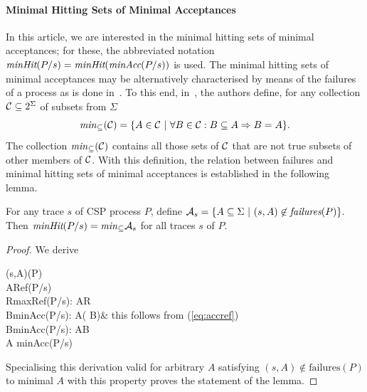 \paragraph{Minimal Hitting Sets of Minimal Acceptances} In this article, we are
interested in the minimal hitting sets of minimal acceptances; for these, the
abbreviated notation
$%
\minhits(P/s) = \minhits(\minaccs(P/s))
$ %
is used. The minimal hitting sets
of minimal acceptances may be alternatively characterised by means of the
failures of a process as is done in~\cite{DBLP:conf/icfem/CavalcantiG07}. To
this end, in~\cite{DBLP:conf/icfem/CavalcantiG07}, the authors define, for
any collection ${\cal C}\subseteq 2^\Sigma$ of subsets from $\Sigma$
\begin{equation}\label{eq:minsub}
{\it min}_\subseteq({\cal C}) = \{ A\in {\cal C}~|~\forall B\in {\cal C}:
B\subseteq A\Rightarrow B = A \}.
\end{equation}
The collection ${\it min}_\subseteq({\cal C})$ contains all those sets of
${\cal C}$ that are not true subsets of other members of ${\cal C}$. With
this definition, the relation between failures and minimal hitting sets of
minimal acceptances is established in the following lemma.
%
\begin{lemma}
\label{lemma:failureshittingsets}
For any trace $s$ of CSP process $P$, define
$%
{\cal A}_s = \{ A\subseteq \Sigma~|~(s,A)\not\in\fails(P)  \}.
$ %
Then
$ %
\minhits(P/s) = \minsub {\cal A}_s
$ %
for all traces $s$ of $P$.
\end{lemma}
\begin{proof}
We derive
\begin{argue}
(s,A)\not\in \fails(P)
\\
\Leftrightarrow A\not\in Ref(P/s)
\\
\Leftrightarrow  \forall R\in maxRef(P/s): A\not\subseteq R
\\
\Leftrightarrow   \forall B\in minAcc(P/s): A\not\subseteq (\Sigma\setminus
B)& this follows from (\ref{eq:accref})
\\
\Leftrightarrow  \forall B\in minAcc(P/s): A\cap B\neq \varnothing
\\
\Leftrightarrow  A 
               minAcc(P/s)
\end{argue}
%
Specialising this derivation valid for arbitrary $A$ satisfying $(s,A)\not\in {\text{failures}}(P)$ to
minimal $A$ with this property proves the statement of the lemma.
\xbox
\end{proof}

